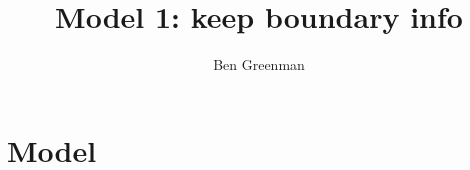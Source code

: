 \documentclass[nonacm,10pt]{acmart}
\title{Model 1: keep boundary info}
\author{Ben Greenman}
\begin{document}
\maketitle

% 
% 
% 
% 
% 
% 
% 
% 
% 
% 
% 
% 
% 
% 
% 


%
%
%
%
%
%



\section{Model}
\end{document}
